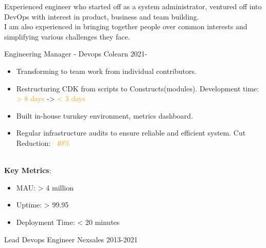 \documentclass[11pt]{spidercv}
\begin{document}
    





    \begin{MainPart}

		{
			Experienced engineer who started off as a system administrator, ventured off into DevOps with interest in product, business and team building. \\
			I am also experienced in bringing together people over common interests and simplifying various challenges they face.

		}
		
    \Experience
        {\ColorHighlight}
		{Engineering Manager - Devops}
		{Colearn}
        {2021-\faUndo}
        {   
        \begin{DoubleColumns}
        		\begin{itemize}
            		\item[\ding{51}]Transforming to team work from individual contributors.
            		\item[\ding{51}]Restructuring CDK from scripts to Constructs(modules). Development time: \textcolor{Orange}{> 8 days} -> \textcolor{Orange}{< 3 days}
            		\item[\ding{51}]Built in-house turnkey environment, metrics dashboard.
            	\end{itemize}
            	\nextcolumn
            	\begin{itemize}
            		\item[\ding{51}]Regular infrastructure audits to ensure reliable and efficient system. Cut Reduction: \textcolor{Orange}{~40\%}\\
            	\end{itemize}
            	\hfill \\
            	\textbf{Key Metrics}:
            	\begin{itemize}
            		\item[\ding{51}]MAU: > 4 million
            		\item[\ding{51}]Uptime: > 99.95%
            		\item[\ding{51}]Deployment Time: < 20 minutes
            	\end{itemize}
            \end{DoubleColumns}
        }
    \Experience
        {\ColorHighlight}
		{Lead Devops Engineer}
		{Nexsales}
        {2013-2021}
        {  
        	
}
\end{MainPart}
\end{document}
